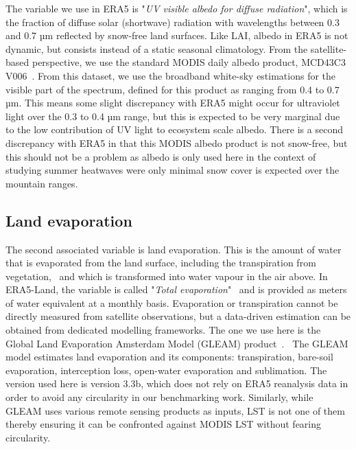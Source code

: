 \documentclass[gmd, manuscript]{copernicus}
\begin{document}
The variable we use in ERA5 is "\emph{UV visible albedo for diffuse radiation}", which is the 
fraction 
of diffuse solar (shortwave) radiation with wavelengths between 0.3 and 0.7 
µm 
reflected by snow-free land surfaces. Like LAI, albedo in 
ERA5 
is not dynamic, but consists instead of a static seasonal climatology. From the 
satellite-based 
perspective, 
we use the standard MODIS daily albedo product, MCD43C3 V006~\citep{Schaaf_2015}. From this
dataset, we use the broadband white-sky estimations for the visible part
of the spectrum, defined for this product as ranging from 0.4 to 0.7 
µm. 
This means some slight discrepancy with ERA5 might occur for
ultraviolet light over the 0.3 to 0.4 µm range, 
but 
this is expected to be very marginal due to the low contribution of UV light to ecosystem
scale albedo. There is a second discrepancy with ERA5 in that this MODIS albedo product is not 
snow-free, 
but this should not be a problem as albedo is only used here in the context of 
studying 
summer heatwaves were only minimal snow cover is expected over the mountain ranges.


\subsection{Land evaporation}


The second associated variable is land evaporation. This is the amount
of water that is evaporated from the land surface, including the
transpiration from vegetation,~ and which is transformed into water
vapour in the air above. In ERA5-Land, the variable is called
"\emph{Total evaporation}"~ and is provided as meters of water
equivalent at a monthly basis. Evaporation or transpiration cannot be
directly measured from satellite observations, but a data-driven
estimation can be obtained from dedicated modelling frameworks. The one
we use here is the Global Land Evaporation Amsterdam Model (GLEAM)
product~\citep{Martens_2017,Miralles_2011}.~ The GLEAM model estimates land evaporation
and its components: transpiration, bare-soil evaporation, interception
loss, open-water evaporation and sublimation. The version used here is
version 3.3b, which does not rely on ERA5 reanalysis data in order to
avoid any circularity in our benchmarking work. Similarly, while GLEAM uses various remote sensing products as inputs, LST is not one of them~\citep{Martens_2017} thereby ensuring it can be confronted against MODIS LST without fearing circularity.
\end{document}
